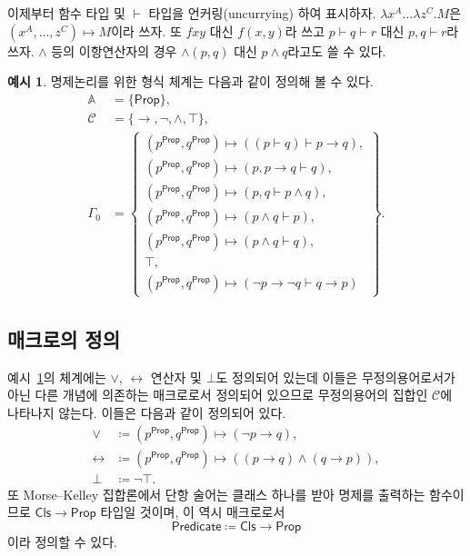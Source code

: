 \documentclass[10pt,twocolumn]{article}
\theoremstyle{definition}
\newtheorem{example}[theorem]{예시}
\newcommand{\Prop}{\mathsf{Prop}}
\newcommand{\Cls}{\mathsf{Cls}}
\newcommand{\Predicate}{\mathsf{Predicate}}
\begin{document}
이제부터 함수 타입 및 $\vdash$ 타입을 언커링(uncurrying) 하여 표시하자. $\lambda x^A\ldots\lambda z^C.M$은 $(x^A, \ldots, z^C)\mapsto M$이라 쓰자. 또 $fxy$ 대신 $f(x, y)$라 쓰고 $p\vdash q\vdash r$ 대신 $p, q\vdash r$라 쓰자. $\land$ 등의 이항연산자의 경우 ${\land}(p, q)$ 대신 $p\land q$라고도 쓸 수 있다.

\begin{example}\label{example:system}
	명제논리를 위한 형식 체계는 다음과 같이 정의해 볼 수 있다.
	\begin{align*}
		\mathbb A &= \{\mathsf{Prop}\}, \\
		\mathcal C &= \{\to, \neg, \land, \top\}, \\
		\Gamma_0 &= \left\{\begin{array}{l}
			(p^\Prop, q^\Prop)\mapsto \left((p\vdash q)\vdash p\to q\right), \\
			(p^\Prop, q^\Prop)\mapsto \left(p, p\to q\vdash q\right), \\
			(p^\Prop, q^\Prop)\mapsto \left(p, q\vdash p\land q\right), \\
			(p^\Prop, q^\Prop)\mapsto \left(p\land q\vdash p\right), \\
			(p^\Prop, q^\Prop)\mapsto \left(p\land q\vdash q\right), \\
			\top, \\
			(p^\Prop, q^\Prop)\mapsto \left(\neg p\to\neg q\vdash q\to p\right)
		\end{array}\right\}.
	\end{align*}
\end{example}

\subsection{매크로의 정의}

예시~\ref{example:system}의 체계에는 $\lor$, $\leftrightarrow$ 연산자 및 $\bot$도 정의되어 있는데 이들은 무정의용어로서가 아닌 다른 개념에 의존하는 매크로로서 정의되어 있으므로 무정의용어의 집합인 $\mathcal C$에 나타나지 않는다. 이들은 다음과 같이 정의되어 있다.
\begin{align*}
	\lor&\coloneqq (p^\Prop, q^\Prop)\mapsto \left(\neg p\to q\right), \\
	\leftrightarrow&\coloneqq (p^\Prop, q^\Prop)\mapsto \left((p\to q)\land(q\to p)\right), \\
	\bot&\coloneqq\neg\top.
\end{align*}
또 Morse--Kelley 집합론에서 단항 술어는 클래스 하나를 받아 명제를 출력하는 함수이므로 $\Cls\to\Prop$ 타입일 것이며, 이 역시 매크로로서
$$\Predicate\coloneqq\Cls\to\Prop$$
이라 정의할 수 있다.
\end{document}
